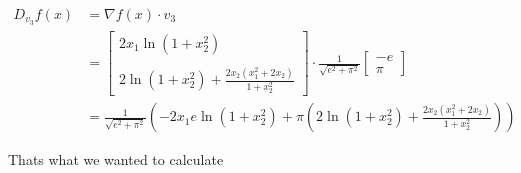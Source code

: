 \documentclass{article}
\begin{document}
\begin{align*}
   D_{v_3} f(x) &= \nabla f(x) \cdot v_3 \\
   &= \begin{bmatrix}
      2x_1 \ln(1 + x_2^2) \\
      \\
      2 \ln(1 + x_2^2) + \frac{2x_2 (x_1^2 + 2x_2)}{1 + x_2^2}
   \end{bmatrix} \cdot \frac{1}{\sqrt{e^2 + \pi^2}} \begin{bmatrix}
      -e \\
      \pi
   \end{bmatrix} \\
   &= \frac{1}{\sqrt{e^2 + \pi^2}} \left( -2x_1 e \ln(1 + x_2^2) + \pi \left( 2 \ln(1 + x_2^2) + \frac{2x_2 (x_1^2 + 2x_2)}{1 + x_2^2} \right) \right)
\end{align*}

Thats what we wanted to calculate
\end{document}
